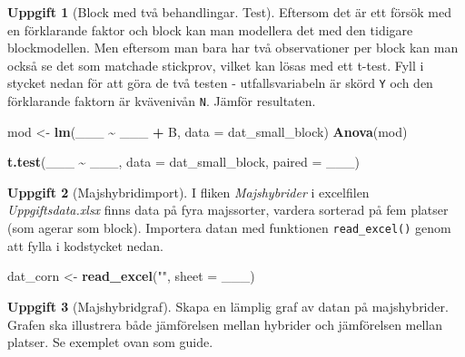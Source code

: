 \documentclass[
]{book}
\newenvironment{Shaded}{\begin{snugshade}}{\end{snugshade}}
\newcommand{\AttributeTok}[1]{\textcolor[rgb]{0.13,0.29,0.53}{#1}}
\newcommand{\FunctionTok}[1]{\textcolor[rgb]{0.13,0.29,0.53}{\textbf{#1}}}
\newcommand{\NormalTok}[1]{#1}
\newcommand{\OtherTok}[1]{\textcolor[rgb]{0.56,0.35,0.01}{#1}}
\newcommand{\SpecialCharTok}[1]{\textcolor[rgb]{0.81,0.36,0.00}{\textbf{#1}}}
\newcommand{\StringTok}[1]{\textcolor[rgb]{0.31,0.60,0.02}{#1}}
\theoremstyle{definition}
\theoremstyle{definition}
\theoremstyle{definition}
\newtheorem{exercise}{Uppgift}[chapter]
\theoremstyle{definition}
\theoremstyle{remark}
\begin{document}
\begin{exercise}[Block med två behandlingar. Test]

Eftersom det är ett försök med en förklarande faktor och block kan man modellera det med den tidigare blockmodellen. Men eftersom man bara har två observationer per block kan man också se det som matchade stickprov, vilket kan lösas med ett t-test. Fyll i stycket nedan för att göra de två testen - utfallsvariabeln är skörd \texttt{Y} och den förklarande faktorn är kvävenivån \texttt{N}. Jämför resultaten.

\begin{Shaded}
\begin{Highlighting}[]
\NormalTok{mod }\OtherTok{\textless{}{-}} \FunctionTok{lm}\NormalTok{(\_\_\_ }\SpecialCharTok{\textasciitilde{}}\NormalTok{ \_\_\_ }\SpecialCharTok{+}\NormalTok{ B, }\AttributeTok{data =}\NormalTok{ dat\_small\_block)}
\FunctionTok{Anova}\NormalTok{(mod)}

\FunctionTok{t.test}\NormalTok{(\_\_\_ }\SpecialCharTok{\textasciitilde{}}\NormalTok{ \_\_\_, }\AttributeTok{data =}\NormalTok{ dat\_small\_block, }\AttributeTok{paired =}\NormalTok{ \_\_\_)}
\end{Highlighting}
\end{Shaded}

\end{exercise}

\begin{exercise}[Majshybridimport]

I fliken \emph{Majshybrider} i excelfilen \emph{Uppgiftsdata.xlsx} finns data på fyra majssorter, vardera sorterad på fem platser (som agerar som block). Importera datan med funktionen \texttt{read\_excel()} genom att fylla i kodstycket nedan.

\begin{Shaded}
\begin{Highlighting}[]
\NormalTok{dat\_corn }\OtherTok{\textless{}{-}} \FunctionTok{read\_excel}\NormalTok{(}\StringTok{""}\NormalTok{, }\AttributeTok{sheet =}\NormalTok{ \_\_\_)}
\end{Highlighting}
\end{Shaded}

\end{exercise}

\begin{exercise}[Majshybridgraf]
Skapa en lämplig graf av datan på majshybrider. Grafen ska illustrera både jämförelsen mellan hybrider och jämförelsen mellan platser. Se exemplet ovan som guide.
\end{exercise}
\end{document}
